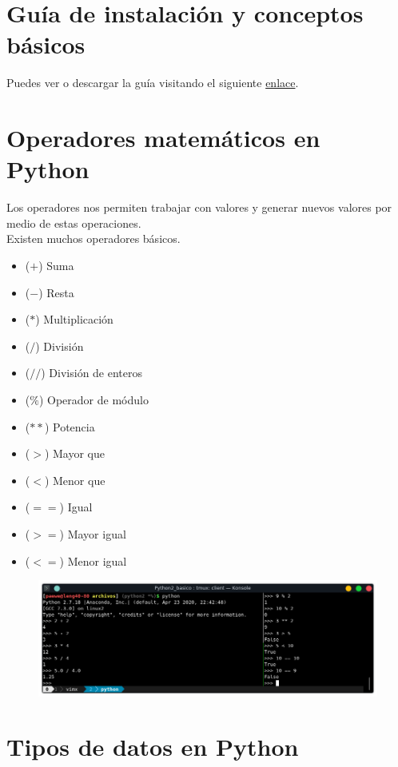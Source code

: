 \documentclass{article}
\begin{document}
\section{Guía de instalación y conceptos básicos}%
Puedes ver o descargar la guía visitando el siguiente
\href{https://drive.google.com/file/d/1Km1giTvN_waI59X0zvQ9akBxtsgqMrcR/view?usp=sharing}{enlace}.

\section{Operadores matemáticos en Python}%
Los operadores nos permiten trabajar con valores y generar nuevos valores por
medio de estas operaciones.\\

Existen muchos operadores básicos.
\begin{itemize}
  \item ($+$) Suma
  \item ($-$) Resta
  \item ($*$) Multiplicación
  \item ($/$) División
  \item ($//$) División de enteros
  \item ($\%$) Operador de módulo
  \item ($**$) Potencia
  \item ($>$) Mayor que
  \item ($<$) Menor que
  \item ($==$) Igual
  \item ($>=$) Mayor igual
  \item ($<=$) Menor igual
\end{itemize}

\newpage

\begin{figure}[h!]
  \centering
  \includegraphics[scale=0.75]{./Pictures/012_operators.png}
\end{figure}

\section{Tipos de datos en Python}%
\end{document}
